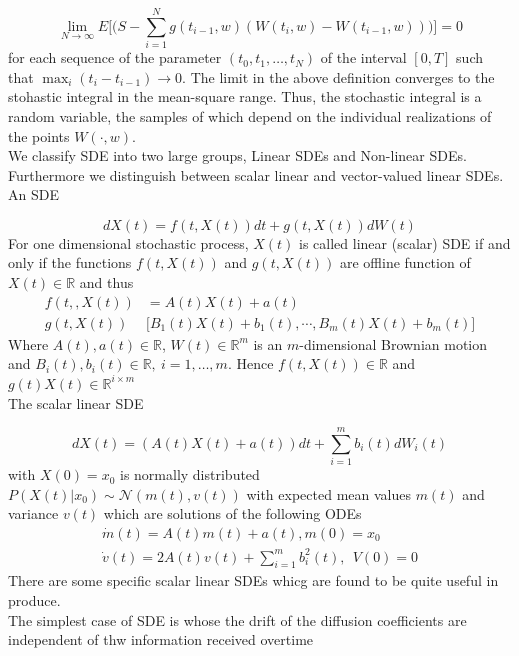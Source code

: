 \documentclass[a4 paper, 12pt]{report}
\theoremstyle{plain}
\begin{document}
\begin{equation}\label{2.1.23}
\lim_{N\rightarrow \infty}E\bigg[\bigg(S - \sum_{i  = 1}^Ng(t_{i-1},w)(W(t_i,w) - W(t_{i-1},w))\bigg)\bigg] = 0
\end{equation}
for each sequence of the parameter $(t_0,t_1,\ldots,t_N)$ of the interval $[0,T]$ such that $\max_i(t_i - t_{i-1})\rightarrow 0$. The limit in the above definition converges to the stohastic integral in the mean-square range. Thus, the stochastic integral is a random variable, the samples of which depend on the individual realizations of the points $W(\cdot,w)$.\\
We classify SDE into two large groups, Linear SDEs and Non-linear SDEs. Furthermore we distinguish between scalar linear and vector-valued linear SDEs.\\
An SDE

\begin{equation}\label{2.1.24}
dX(t) = f(t,X(t))dt+g(t,X(t))dW(t)
\end{equation}
For one dimensional stochastic process, $X(t)$ is called linear (scalar) SDE if and only if the functions $f(t,X(t))$ and $g(t,X(t))$ are offline function of $X(t)\in\mathbb{R}$ and thus
\begin{align*}
f(t,,X(t))& =  A(t)X(t)+a(t)\\
g(t,X(t))&\bigg[B_1(t)X(t)+b_1(t),\cdots,B_m(t)X(t)+b_m(t)\bigg]
\end{align*}
Where $A(t), a(t)\in\mathbb{R}$, $W(t)\in\mathbb{R}^m$ is an $m$-dimensional Brownian motion and $B_i(t),b_i(t)\in\mathbb{R},~i = 1,\ldots,m$. Hence $f(t,X(t))\in\mathbb{R}$ and $g(t)X(t)\in\mathbb{R}^{i\times m}$\\
The scalar linear SDE

\begin{equation}\label{2.1.25}
dX(t) = (A(t)X(t)+a(t))dt+\sum_{i = 1}^mb_i(t)dW_i(t)
\end{equation}
with $X(0) = x_0$ is normally distributed\\
$P(X(t)|x_0)\sim\mathcal{N}(m(t),v(t))$ with expected mean values $m(t)$ and variance $v(t)$ which are solutions of the following ODEs
\begin{align*}
\dot{m}(t) = A(t)m(t)+a(t),m(0) = x_0\\
\dot{v}(t) = 2A(t)v(t)+\sum_{i = 1}^mb_i^2(t),~~V(0) = 0
\end{align*} 
There are some specific scalar linear SDEs whicg are found to be quite useful in produce.\\
The simplest case of SDE is whose the drift of the diffusion coefficients are independent of thw information received overtime
\end{document}
